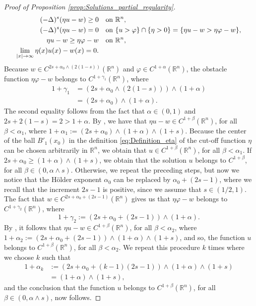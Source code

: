 \documentclass[11pt,reqno]{amsart}
\theoremstyle{definition}
\theoremstyle{remark}
\begin{document}
\begin{proof}[Proof of Proposition \ref{prop:Solutions_partial_regularity}]
\begin{equation}
\label{eq:Simplified_obstacle_problem}
\begin{aligned}
(-\Delta)^s  (\eta u -w) \geq 0&\quad\hbox{on }{\mathbb{R}}^n,\\
(-\Delta)^s (\eta u -w) = 0&\quad\hbox{on } \{u>\varphi\} \cap \{\eta>0\} = \{\eta u-w>\eta\varphi-w\},\\
\eta u-w\geq \eta\varphi-w &\quad\hbox{on }{\mathbb{R}}^n,\\
\lim_{|x|\rightarrow\infty} \eta(x)u(x)-w(x)=0.
\end{aligned}
\end{equation}
Because $w\in C^{2s+\alpha_0\wedge (2(1-s))}({\mathbb{R}}^n)$ and $\varphi \in C^{1+\alpha}({\mathbb{R}}^n)$, the obstacle function $\eta \varphi-w$ belongs to $C^{1+\gamma_1}({\mathbb{R}}^n)$, where 
\begin{align*}
1+\gamma_1&=(2s+\alpha_0 \wedge (2(1-s)))\wedge (1+\alpha)\\
&=(2s+\alpha_0)\wedge (1+\alpha).
\end{align*}
The second equality follows from the fact that $\alpha\in (0,1)$ and $2s+2(1-s)=2>1+\alpha$. By \cite[Theorem 5.8]{Silvestre_2007}, we have that $\eta u-w\in C^{1+\beta}({\mathbb{R}}^n)$, for all $\beta<\alpha_1$, where $1+\alpha_1:=(2s+\alpha_0)\wedge (1+\alpha)\wedge (1+s)$. Because the center of the ball $B'_1(x_0)$ in the definition \eqref{eq:Definition_eta} of the cut-off function $\eta$ can be chosen arbitrarily in ${\mathbb{R}}^n$, we obtain that $u \in C^{1+\beta}({\mathbb{R}}^n)$, for all $\beta<\alpha_1$. If $2s+\alpha_0 \geq (1+\alpha)\wedge (1+s)$, we obtain that the solution $u$ belongs to $C^{1+\beta}$, for all $\beta\in(0,\alpha\wedge s)$. Otherwise, we repeat the preceding steps, but now we notice that the H\"older exponent $\alpha_0$ can be replaced by $\alpha_0+(2s-1)$, where we recall that the increment $2s-1$ is positive, since we assume that $s\in (1/2,1)$. The fact that $w\in C^{2s+\alpha_0+(2s-1)}({\mathbb{R}}^n)$ gives us that $\eta \varphi-w$ belongs to $C^{1+\gamma_2}({\mathbb{R}}^n)$, where 
$$
1+\gamma_2:=(2s+\alpha_0+(2s-1))\wedge (1+\alpha).
$$
By \cite[Theorem 5.8]{Silvestre_2007}, it follows that $\eta u-w\in C^{1+\beta}({\mathbb{R}}^n)$, for all $\beta<\alpha_2$, where $1+\alpha_2:=(2s+\alpha_0+(2s-1))\wedge (1+\alpha)\wedge (1+s)$, and so, the function $u$ belongs to $C^{1+\beta}({\mathbb{R}}^n)$, for all $\beta<\alpha_2$. We repeat this procedure $k$ times where we choose $k$ such that
\begin{align*}
1+\alpha_k&:=(2s+\alpha_0+(k-1)(2s-1))\wedge (1+\alpha)\wedge (1+s)\\
& = (1+\alpha)\wedge (1+s),
\end{align*}
and the conclusion that the function $u$ belongs to $C^{1+\beta}({\mathbb{R}}^n)$, for all $\beta\in (0,\alpha\wedge s)$, now follows. 
\end{proof}
\end{document}

